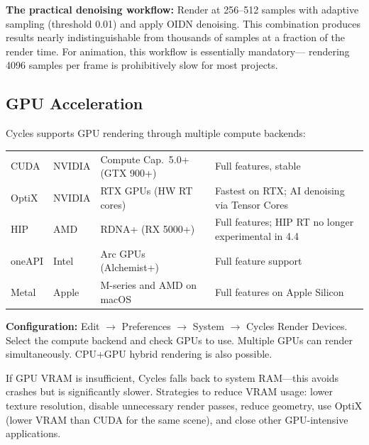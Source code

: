 \begin{tipbox}
\textbf{The practical denoising workflow:} Render at 256--512
samples with adaptive sampling (threshold 0.01) and apply OIDN
denoising. This combination produces results nearly
indistinguishable from thousands of samples at a fraction of the
render time. For animation, this workflow is essentially mandatory---
rendering 4096 samples per frame is prohibitively slow for most
projects.
\end{tipbox}

\subsection{GPU Acceleration}
\label{sec:shading:cycles:gpu}

Cycles supports GPU rendering through multiple compute backends:

\begin{center}
\begin{tabularx}{\textwidth}{L{1.8cm}L{2cm}L{3.5cm}X}
\toprule
{}
 &  &  &  \\
\midrule
CUDA & NVIDIA & Compute Cap.\ 5.0+ (GTX 900+) & Full features, stable \\
OptiX & NVIDIA & RTX GPUs (HW RT cores) & Fastest on RTX; AI denoising via Tensor Cores \\
HIP & AMD & RDNA+ (RX 5000+) & Full features; HIP RT no longer experimental in 4.4 \\
oneAPI & Intel & Arc GPUs (Alchemist+) & Full feature support \\
Metal & Apple & M-series and AMD on macOS & Full features on Apple Silicon \\
\bottomrule
\end{tabularx}
\end{center}

\textbf{Configuration:} Edit $\rightarrow$ Preferences $\rightarrow$
System $\rightarrow$ Cycles Render Devices. Select the compute
backend and check GPUs to use. Multiple GPUs can render
simultaneously. CPU+GPU hybrid rendering is also possible.

\begin{warningbox}
If GPU VRAM is insufficient, Cycles falls back to system RAM---this
avoids crashes but is significantly slower. Strategies to reduce
VRAM usage: lower texture resolution, disable unnecessary render
passes, reduce geometry, use OptiX (lower VRAM than CUDA for the
same scene), and close other GPU-intensive applications.
\end{warningbox}


